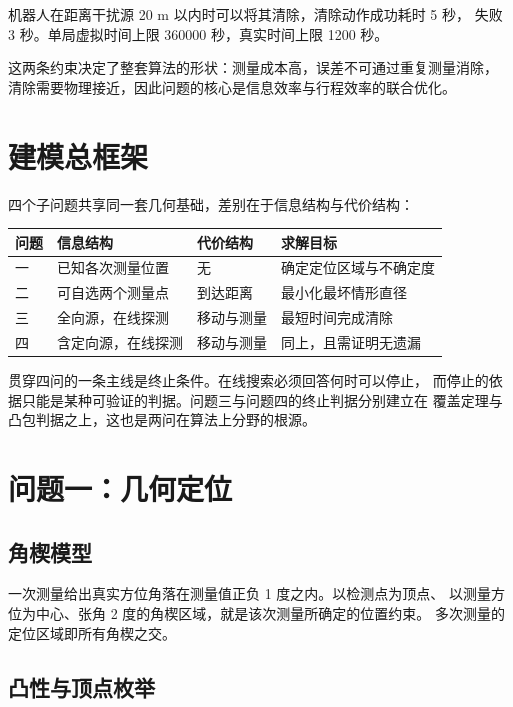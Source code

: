 机器人在距离干扰源 20 m 以内时可以将其清除，清除动作成功耗时 5 秒，
失败 3 秒。单局虚拟时间上限 360000 秒，真实时间上限 1200 秒。

这两条约束决定了整套算法的形状：测量成本高，误差不可通过重复测量消除，
清除需要物理接近，因此问题的核心是信息效率与行程效率的联合优化。

\section{建模总框架}

四个子问题共享同一套几何基础，差别在于信息结构与代价结构：

\begin{center}
\begin{tabular}{llll}
\toprule
问题 & 信息结构 & 代价结构 & 求解目标 \\
\midrule
一 & 已知各次测量位置 & 无 & 确定定位区域与不确定度 \\
二 & 可自选两个测量点 & 到达距离 & 最小化最坏情形直径 \\
三 & 全向源，在线探测 & 移动与测量 & 最短时间完成清除 \\
四 & 含定向源，在线探测 & 移动与测量 & 同上，且需证明无遗漏 \\
\bottomrule
\end{tabular}
\end{center}

贯穿四问的一条主线是终止条件。在线搜索必须回答何时可以停止，
而停止的依据只能是某种可验证的判据。问题三与问题四的终止判据分别建立在
覆盖定理与凸包判据之上，这也是两问在算法上分野的根源。

\section{问题一：几何定位}

\subsection{角楔模型}

一次测量给出真实方位角落在测量值正负 1 度之内。以检测点为顶点、
以测量方位为中心、张角 2 度的角楔区域，就是该次测量所确定的位置约束。
多次测量的定位区域即所有角楔之交。

\subsection{凸性与顶点枚举}

